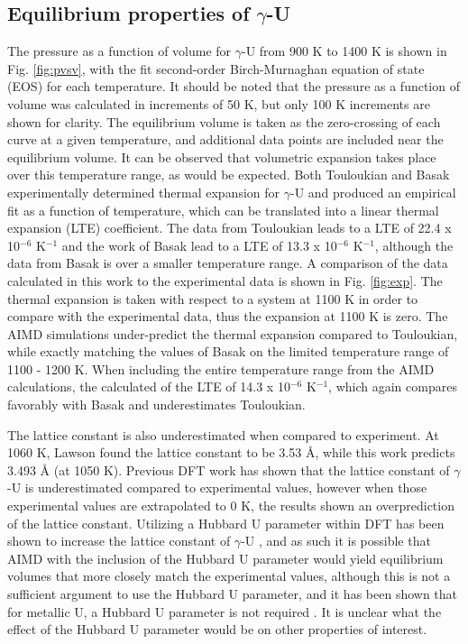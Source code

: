 \documentclass[review]{elsarticle}
\begin{document}
\subsection{Equilibrium properties of $\gamma$-U}

The pressure as a function of volume for $\gamma$-U from 900 K to 1400 K is shown in Fig. \ref{fig:pvsv}, with the fit second-order Birch-Murnaghan equation of state (EOS) for each temperature. It should be noted that the pressure as a function of volume was calculated in increments of 50 K, but only 100 K increments are shown for clarity. The equilibrium volume is taken as the zero-crossing of each curve at a given temperature, and additional data points are included near the equilibrium volume. It can be observed that volumetric expansion takes place over this temperature range, as would be expected. Both Touloukian \cite{touloukian} and Basak \cite{basak} experimentally determined thermal expansion for $\gamma$-U and produced an empirical fit as a function of temperature, which can be translated into a linear thermal expansion (LTE) coefficient. The data from Touloukian leads to a LTE of 22.4 x 10$^{-6}$ K$^{-1}$ and the work of Basak lead to a LTE of 13.3 x 10$^{-6}$ K$^{-1}$, although the data from Basak is over a smaller temperature range. A comparison of the data calculated in this work to the experimental data is shown in Fig. \ref{fig:exp}. The thermal expansion is taken with respect to a system at 1100 K in order to compare with the experimental data, thus the expansion at 1100 K is zero. The AIMD simulations under-predict the thermal expansion compared to Touloukian, while exactly matching the values of Basak on the limited temperature range of 1100 - 1200 K. When including the entire temperature range from the AIMD calculations, the calculated of the LTE of 14.3 x 10$^{-6}$ K$^{-1}$, which again compares favorably with Basak and underestimates Touloukian.

The lattice constant is also underestimated when compared to experiment. At 1060 K, Lawson \cite{lawson1988} found the lattice constant to be 3.53 {\AA}, while this work predicts 3.493 {\AA} (at 1050 K). Previous DFT work has shown that the lattice constant of $\gamma$-U is underestimated compared to experimental values, however when those experimental values are extrapolated to 0 K, the results shown an overprediction of the lattice constant\cite{beeler2010, xie2013}. Utilizing a Hubbard U parameter within DFT has been shown to increase the lattice constant of $\gamma$-U \cite{xie2013}, and as such it is possible that AIMD with the inclusion of the Hubbard U parameter would yield equilibrium volumes that more closely match the experimental values, although this is not a sufficient argument to use the Hubbard U parameter, and it has been shown that for metallic U, a Hubbard U parameter is not required \cite{wirth2012, wirth2011, beeler2010, taylor2008, beeler2013}. It is unclear what the effect of the Hubbard U parameter would be on other properties of interest. 
\end{document}
